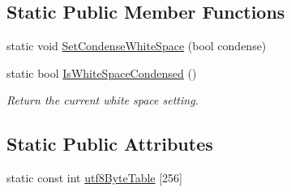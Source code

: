 \subsection*{Static Public Member Functions}
\begin{DoxyCompactItemize}
\item 
static void \hyperlink{class_ti_xml_base_a0f799ec645bfb8d8a969e83478f379c1}{Set\+Condense\+White\+Space} (bool condense)
\item 
static bool \hyperlink{class_ti_xml_base_ad4b1472531c647a25b1840a87ae42438}{Is\+White\+Space\+Condensed} ()
\begin{DoxyCompactList}\small\item\em Return the current white space setting. \end{DoxyCompactList}\end{DoxyCompactItemize}
\subsection*{Static Public Attributes}
\begin{DoxyCompactItemize}
\item 
static const int \hyperlink{class_ti_xml_base_ac8c86058137bdb4b413c3eca58f2d467}{utf8\+Byte\+Table} \mbox{[}256\mbox{]}
\end{DoxyCompactItemize}

